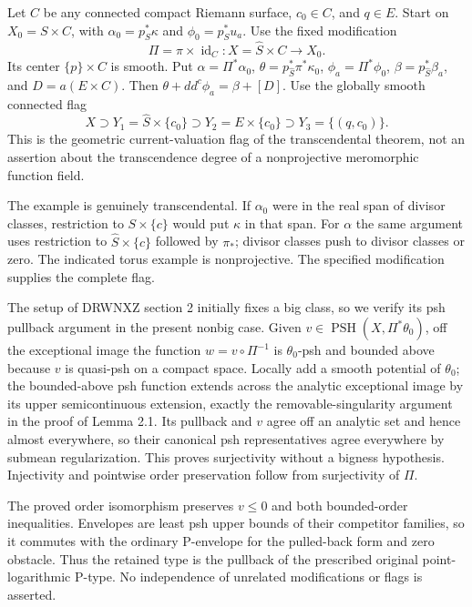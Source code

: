 \documentclass[11pt]{article}
\newcommand{\ddc}{dd^c}
\newcommand{\PSH}{\operatorname{PSH}}
\begin{document}
Let $C$ be any connected compact Riemann surface, $c_0\in C$, and $q\in E$. Start on $X_0=S\times C$, with $\alpha_0=p_S^*\kappa$ and $\phi_0=p_S^*u_a$. Use the fixed modification
\[
 \Pi=\pi\times\operatorname{id}_C:X=\widehat S\times C\longrightarrow X_0.
\]
Its center $\{p\}\times C$ is smooth. Put $\alpha=\Pi^*\alpha_0$, $\theta=p_{\widehat S}^*\pi^*\kappa_0$, $\phi_a=\Pi^*\phi_0$, $\beta=p_{\widehat S}^*\beta_a$, and $D=a(E\times C)$. Then $\theta+\ddc\phi_a=\beta+[D]$. Use the globally smooth connected flag
\[
 X\supset Y_1=\widehat S\times\{c_0\}
  \supset Y_2=E\times\{c_0\}\supset Y_3=\{(q,c_0)\}. \tag{3.2}
\]
This is the geometric current-valuation flag of the transcendental theorem, not an assertion about the transcendence degree of a nonprojective meromorphic function field.

The example is genuinely transcendental. If $\alpha_0$ were in the real span of divisor classes, restriction to $S\times\{c\}$ would put $\kappa$ in that span. For $\alpha$ the same argument uses restriction to $\widehat S\times\{c\}$ followed by $\pi_*$; divisor classes push to divisor classes or zero. The indicated torus example is nonprojective. The specified modification supplies the complete flag.

The setup of DRWNXZ section 2 initially fixes a big class, so we verify its psh pullback argument in the present nonbig case. Given $v\in\PSH(X,\Pi^*\theta_0)$, off the exceptional image the function $w=v\circ\Pi^{-1}$ is $\theta_0$-psh and bounded above because $v$ is quasi-psh on a compact space. Locally add a smooth potential of $\theta_0$; the bounded-above psh function extends across the analytic exceptional image by its upper semicontinuous extension, exactly the removable-singularity argument in the proof of Lemma 2.1. Its pullback and $v$ agree off an analytic set and hence almost everywhere, so their canonical psh representatives agree everywhere by submean regularization. This proves surjectivity without a bigness hypothesis. Injectivity and pointwise order preservation follow from surjectivity of $\Pi$.

The proved order isomorphism preserves $v\leq0$ and both bounded-order inequalities. Envelopes are least psh upper bounds of their competitor families, so it commutes with the ordinary P-envelope for the pulled-back form and zero obstacle. Thus the retained type is the pullback of the prescribed original point-logarithmic P-type. No independence of unrelated modifications or flags is asserted.
\end{document}
